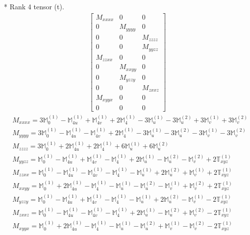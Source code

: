 \documentclass[fleqn,8pt,landscape]{jsarticle}
\begin{document}
* Rank 4 tensor (t).
\begin{align*}
\begin{bmatrix} M_{xxxx} & 0 & 0 \\ 0 & M_{yyyy} & 0 \\ 0 & 0 & M_{zzzz} \\ 0 & 0 & M_{yyzz} \\ M_{zzxx} & 0 & 0 \\ 0 & M_{xxyy} & 0 \\ 0 & M_{yzzy} & 0 \\ 0 & 0 & M_{zxxz} \\ M_{xyyx} & 0 & 0 \\ 0 & 0 & 0 \end{bmatrix}
\end{align*}
\begin{align*}
& M_{xxxx} = 3 \mathbb{M}_{0}^{(1)} - \mathbb{M}_{4u}^{(1)} + \mathbb{M}_{4v}^{(1)} + 2 \mathbb{M}_{4}^{(1)} - 3 \mathbb{M}_{u}^{(1)} - 3 \mathbb{M}_{u}^{(2)} + 3 \mathbb{M}_{v}^{(1)} + 3 \mathbb{M}_{v}^{(2)} \\
& M_{yyyy} = 3 \mathbb{M}_{0}^{(1)} - \mathbb{M}_{4u}^{(1)} - \mathbb{M}_{4v}^{(1)} + 2 \mathbb{M}_{4}^{(1)} - 3 \mathbb{M}_{u}^{(1)} - 3 \mathbb{M}_{u}^{(2)} - 3 \mathbb{M}_{v}^{(1)} - 3 \mathbb{M}_{v}^{(2)} \\
& M_{zzzz} = 3 \mathbb{M}_{0}^{(1)} + 2 \mathbb{M}_{4u}^{(1)} + 2 \mathbb{M}_{4}^{(1)} + 6 \mathbb{M}_{u}^{(1)} + 6 \mathbb{M}_{u}^{(2)} \\
& M_{yyzz} = \mathbb{M}_{0}^{(1)} - \mathbb{M}_{4u}^{(1)} + \mathbb{M}_{4v}^{(1)} - \mathbb{M}_{4}^{(1)} + 2 \mathbb{M}_{u}^{(1)} - \mathbb{M}_{u}^{(2)} - \mathbb{M}_{v}^{(2)} + 2 \mathbb{T}_{xyz}^{(1)} \\
& M_{zzxx} = \mathbb{M}_{0}^{(1)} - \mathbb{M}_{4u}^{(1)} - \mathbb{M}_{4v}^{(1)} - \mathbb{M}_{4}^{(1)} - \mathbb{M}_{u}^{(1)} + 2 \mathbb{M}_{u}^{(2)} + \mathbb{M}_{v}^{(1)} + 2 \mathbb{T}_{xyz}^{(1)} \\
& M_{xxyy} = \mathbb{M}_{0}^{(1)} + 2 \mathbb{M}_{4u}^{(1)} - \mathbb{M}_{4}^{(1)} - \mathbb{M}_{u}^{(1)} - \mathbb{M}_{u}^{(2)} - \mathbb{M}_{v}^{(1)} + \mathbb{M}_{v}^{(2)} + 2 \mathbb{T}_{xyz}^{(1)} \\
& M_{yzzy} = \mathbb{M}_{0}^{(1)} - \mathbb{M}_{4u}^{(1)} + \mathbb{M}_{4v}^{(1)} - \mathbb{M}_{4}^{(1)} - \mathbb{M}_{u}^{(1)} + 2 \mathbb{M}_{u}^{(2)} - \mathbb{M}_{v}^{(1)} - 2 \mathbb{T}_{xyz}^{(1)} \\
& M_{zxxz} = \mathbb{M}_{0}^{(1)} - \mathbb{M}_{4u}^{(1)} - \mathbb{M}_{4v}^{(1)} - \mathbb{M}_{4}^{(1)} + 2 \mathbb{M}_{u}^{(1)} - \mathbb{M}_{u}^{(2)} + \mathbb{M}_{v}^{(2)} - 2 \mathbb{T}_{xyz}^{(1)} \\
& M_{xyyx} = \mathbb{M}_{0}^{(1)} + 2 \mathbb{M}_{4u}^{(1)} - \mathbb{M}_{4}^{(1)} - \mathbb{M}_{u}^{(1)} - \mathbb{M}_{u}^{(2)} + \mathbb{M}_{v}^{(1)} - \mathbb{M}_{v}^{(2)} - 2 \mathbb{T}_{xyz}^{(1)}
\end{align*}
\end{document}
